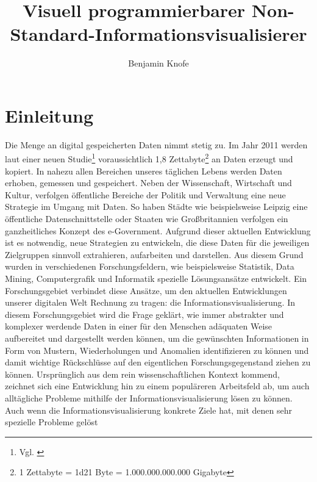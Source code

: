 \documentclass[a4paper, 12pt, DIVcalc, onepage, pdftex, headsepline, footsepline]{scrreprt}
\begin{document}
\title{Visuell programmierbarer Non-Standard-Informationsvisualisierer}
\author{Benjamin Knofe}
\subject{Diplomarbeit}
\publishers{Hochschule für Technik, Wirtschaft und Kultur Leipzig}
\dedication{Dank an \\ Christina Sanko, Pyry Jahkola, Ted Mosby, Sarah Walter, Professor Dr. Robert Müller, Philip Whitfield}
\maketitle
\tableofcontents

\chapter{Einleitung}
\label{cha:Einleitung}
Die Menge an digital gespeicherten Daten nimmt stetig zu. Im Jahr 2011 werden laut einer neuen
Studie\footnote{Vgl. \citep{EMC}} voraussichtlich 1,8 Zettabyte\footnote{1 Zettabyte = \num{1d21}
Byte = 1.000.000.000.000 Gigabyte} an Daten erzeugt und kopiert. In nahezu allen Bereichen unseres
täglichen Lebens werden Daten erhoben, gemessen und gespeichert. Neben der Wissenschaft, Wirtschaft
und Kultur, verfolgen öffentliche Bereiche der Politik und Verwaltung eine neue Strategie im Umgang
mit Daten. So haben Städte wie beispielsweise Leipzig eine öffentliche Datenschnittstelle oder
Staaten wie Großbritannien verfolgen ein ganzheitliches Konzept des e-Government. Aufgrund dieser
aktuellen Entwicklung ist es notwendig, neue Strategien zu entwickeln, die diese Daten
für die jeweiligen Zielgruppen sinnvoll extrahieren, aufarbeiten und darstellen. Aus diesem
Grund wurden in verschiedenen Forschungsfeldern, wie beispielsweise Statistik, Data Mining,
Computergrafik und Informatik spezielle Lösungsansätze entwickelt. Ein Forschungsgebiet verbindet diese
Ansätze, um den aktuellen Entwicklungen unserer digitalen Welt Rechnung zu tragen: die Informationsvisualisierung.
In diesem Forschungsgebiet wird die Frage geklärt, wie immer abstrakter und komplexer werdende Daten
in einer für den Menschen adäquaten Weise aufbereitet und dargestellt werden können, um die gewünschten
Informationen in Form von Mustern, Wiederholungen und Anomalien identifizieren zu können und damit wichtige
Rückschlüsse auf den eigentlichen Forschungsgegenstand ziehen zu können. Ursprünglich aus dem rein
wissenschaftlichen Kontext kommend, zeichnet sich eine Entwicklung hin zu einem populäreren Arbeitsfeld ab,
um auch alltägliche Probleme mithilfe der Informationsvisualisierung lösen zu können.
Auch wenn die Informationsvisualisierung konkrete Ziele hat, mit denen sehr spezielle Probleme gelöst
\end{document}
